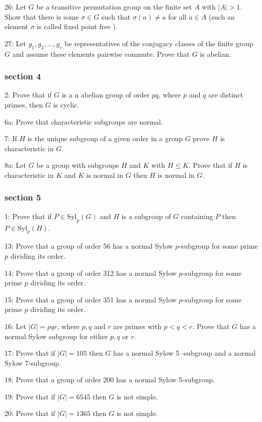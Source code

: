 \documentclass{article}
\begin{document}
26: Let $G$ be a transitive permutation group on the finite set $A$ with $|A|>1$. Show that there is some $\sigma \in G$ such that $\sigma(a) \neq a$ for all $a \in A$ (such an element $\sigma$ is called fixed point free ).

27: Let $g_{1}, g_{2}, \ldots, g_{r}$ be representatives of the conjugacy classes of the finite group $G$ and assume these elements pairwise commute. Prove that $G$ is abelian.


\subsubsection*{section 4}
2: Prove that if $G$ is a n abelian group of order $p q$, where $p$ and $q$ are distinct primes, then $G$ is cyclic.

6a: Prove that characteristic subgroups are normal.

7: If $H$ is the unique subgroup of a given order in a group $G$ prove $H$ is characteristic in $G$.

8a: Let $G$ be a group with subgroups $H$ and $K$ with $H \leq K$. Prove that if $H$ is characteristic in $K$ and $K$ is normal in $G$ then $H$ is normal in $G$.

\subsubsection*{section 5}
1: Prove that if $P \in \mathrm{Syl}_{p}(G)$ and $H$ is a subgroup of $G$ containing $P$ then $P \in\mathrm{Syl}_{p}(H)$.

13: Prove that a group of order 56 has a normal Sylow $p$-subgroup for some prime $p$ dividing its order.

14: Prove that a group of order 312 has a normal Sylow $p$-subgroup for some prime $p$ dividing its order.

15: Prove that a group of order 351 has a normal Sylow $p$-subgroup for some prime $p$ dividing its order.

16: Let $|G|=p q r$, where $p, q$ and $r$ are primes with $p<q<r$. Prove that $G$ has a normal Sylow subgroup for either $p, q$ or $r$.

17: Prove that if $|G|=105$ then $G$ has a normal Sylow 5 -subgroup and a normal Sylow 7-subgroup.

18: Prove that a group of order 200 has a normal Sylow 5-subgroup.

19: Prove that if $|G|=6545$ then $G$ is not simple.

20: Prove that if $|G|=1365$ then $G$ is not simple.
\end{document}
